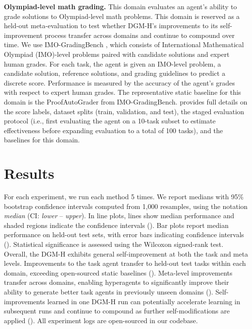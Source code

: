 \documentclass[]{fairmeta}
\begin{document}
\textbf{Olympiad-level math grading.}
This domain evaluates an agent's ability to grade solutions to Olympiad-level math problems. This domain is reserved as a held-out meta-evaluation to test whether DGM-H's improvements to its self-improvement process transfer across domains and continue to compound over time. We use IMO-GradingBench \citep{luong2025towards}, which consists of International Mathematical Olympiad (IMO)-level problems paired with candidate solutions and expert human grades. For each task, the agent is given an IMO-level problem, a candidate solution, reference solutions, and grading guidelines to predict a discrete score. Performance is measured by the accuracy of the agent's grades with respect to expert human grades. The representative static baseline for this domain is the ProofAutoGrader from IMO-GradingBench.  provides full details on the score labels, dataset splits (train, validation, and test), the staged evaluation protocol (i.e., first evaluating the agent on a 10-task subset to estimate effectiveness before expanding evaluation to a total of 100 tasks), and the baselines for this domain.

\section{Results}
\label{sec:results}

For each experiment, we run each method 5 times. We report medians with 95\% bootstrap confidence intervals computed from 1,000 resamples, using the notation \textit{median} (CI: \textit{lower} -- \textit{upper}). In line plots, lines show median performance and shaded regions indicate the confidence intervals (). Bar plots report median performance on held-out test sets, with error bars indicating confidence intervals (). Statistical significance is assessed using the Wilcoxon signed-rank test. Overall, the DGM-H exhibits general self-improvement at both the task and meta levels. Improvements to the task agent transfer to held-out test tasks within each domain, exceeding open-sourced static baselines (). Meta-level improvements transfer across domains, enabling hyperagents to significantly improve their ability to generate better task agents in previously unseen domains (). Self-improvements learned in one DGM-H run can potentially accelerate learning in subsequent runs and continue to compound as further self-modifications are applied (). All experiment logs are open-sourced in our codebase.
\end{document}
